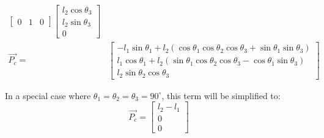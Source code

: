 \documentclass[conference]{IEEEtran}
\begin{document}
\begin{small}
\begin{align*}
\begin{bmatrix}
                                                             0             & 1 & 0
                                                         \end{bmatrix} \begin{bmatrix}
                                                                           l_2 \cos \theta_3 \\
                                                                           l_2 \sin \theta_3 \\
                                                                           0
                                                                       \end{bmatrix}                                                                                       \\
        \vec{\mathbf{\mathit{P_c}}} =    & \begin{bmatrix}
                                               -l_1 \sin\theta_1 + l_2 (\cos\theta_1 \cos\theta_2 \cos\theta_3 + \sin\theta_1 \sin\theta_3) \\
                                               l_1 \cos\theta_1 + l_2 (\sin\theta_1 \cos\theta_2 \cos\theta_3 - \cos\theta_1 \sin\theta_3)  \\
                                               l_2 \sin\theta_2 \cos\theta_3
                                           \end{bmatrix}
    \end{align*}
\end{small}

In a special case where $\theta_1 = \theta_2 = \theta_3 = 90^\circ$, this term will be simplified to:
$$
    \vec{\mathbf{\mathit{P_c}}} = \begin{bmatrix}
        l_2 - l_1 \\
        0         \\
        0
    \end{bmatrix}
$$
\end{document}
